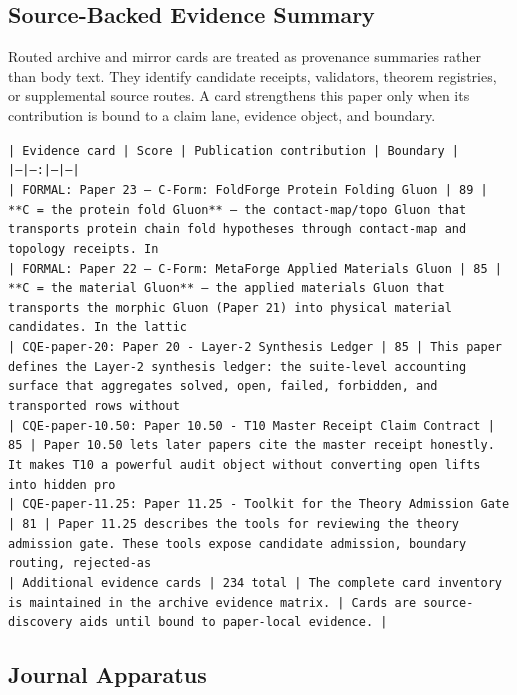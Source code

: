 \documentclass[11pt]{article}
\begin{document}
\subsection*{Source-Backed Evidence Summary}

Routed archive and mirror cards are treated as provenance summaries rather than
body text. They identify candidate receipts, validators, theorem registries, or
supplemental source routes. A card strengthens this paper only when its
contribution is bound to a claim lane, evidence object, and boundary.

\noindent\texttt{| Evidence card | Score | Publication contribution | Boundary |}\\
\noindent\texttt{|---|---:|---|---|}\\
\noindent\texttt{| FORMAL: Paper 23 — C-Form: FoldForge Protein Folding Gluon | 89 | **C = the protein fold Gluon** — the contact-map/topo Gluon that transports protein chain fold hypotheses through contact-map and topology receipts. In }\\
\noindent\texttt{| FORMAL: Paper 22 — C-Form: MetaForge Applied Materials Gluon | 85 | **C = the material Gluon** — the applied materials Gluon that transports the morphic Gluon (Paper 21) into physical material candidates. In the lattic}\\
\noindent\texttt{| CQE-paper-20: Paper 20 - Layer-2 Synthesis Ledger | 85 | This paper defines the Layer-2 synthesis ledger: the suite-level accounting surface that aggregates solved, open, failed, forbidden, and transported rows without}\\
\noindent\texttt{| CQE-paper-10.50: Paper 10.50 - T10 Master Receipt Claim Contract | 85 | Paper 10.50 lets later papers cite the master receipt honestly. It makes T10 a powerful audit object without converting open lifts into hidden pro}\\
\noindent\texttt{| CQE-paper-11.25: Paper 11.25 - Toolkit for the Theory Admission Gate | 81 | Paper 11.25 describes the tools for reviewing the theory admission gate. These tools expose candidate admission, boundary routing, rejected-as}\\
\noindent\texttt{| Additional evidence cards | 234 total | The complete card inventory is maintained in the archive evidence matrix. | Cards are source-discovery aids until bound to paper-local evidence. |}\\

\subsection*{Journal Apparatus}
\end{document}
